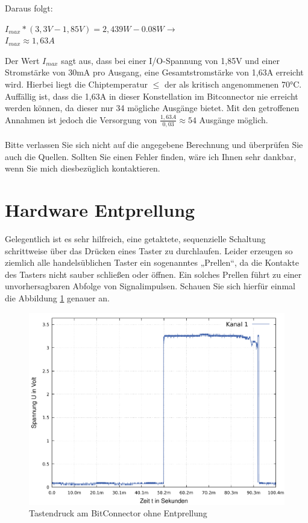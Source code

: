 \documentclass{article}
\begin{document}
Daraus folgt: 
\begin{center}
	$I_{max} * (3,3V - 1,85V) = 2,439 W - 0.08W \rightarrow$\\
	\underline{\underline{$I_{max}\approx 1,63A $}}
\end{center}
Der Wert $I_{max}$ sagt aus, dass bei einer I/O-Spannung von 1,85V und einer Stromstärke von 30mA pro Ausgang, eine Gesamtstromstärke von 1,63A erreicht wird. Hierbei liegt die Chiptemperatur $\leq $ der als kritisch angenommenen 70$\si{\celsius}$. Auffällig ist, dass die 1,63A in dieser Konstellation im Bitconnector nie erreicht werden können, da dieser nur 34 mögliche Ausgänge bietet. Mit den getroffenen Annahmen ist jedoch die Versorgung von $\frac{1,63A}{0,03}\approx54$ Ausgänge möglich.\\\\
Bitte verlassen Sie sich nicht auf die angegebene Berechnung und überprüfen Sie auch die Quellen. Sollten Sie einen Fehler finden, wäre ich Ihnen sehr dankbar, wenn Sie mich diesbezüglich kontaktieren.

\section{Hardware Entprellung}
Gelegentlich ist es sehr hilfreich, eine getaktete, sequenzielle Schaltung schrittweise über das Drücken eines Taster zu durchlaufen. Leider erzeugen so ziemlich alle handelsüblichen Taster ein sogenanntes „Prellen“, da die Kontakte des Tasters nicht sauber schließen oder öffnen. Ein solches Prellen führt zu einer unvorhersagbaren Abfolge von Signalimpulsen. Schauen Sie sich hierfür einmal die Abbildung \ref{fig:prellen_1} genauer an. 

\begin{figure}[!h]
	\centering
	\includegraphics[width=0.92\linewidth]{Figures/bounce}
	\caption{Tastendruck am BitConnector ohne Entprellung}
	\label{fig:prellen_1}
\end{figure}
\end{document}
